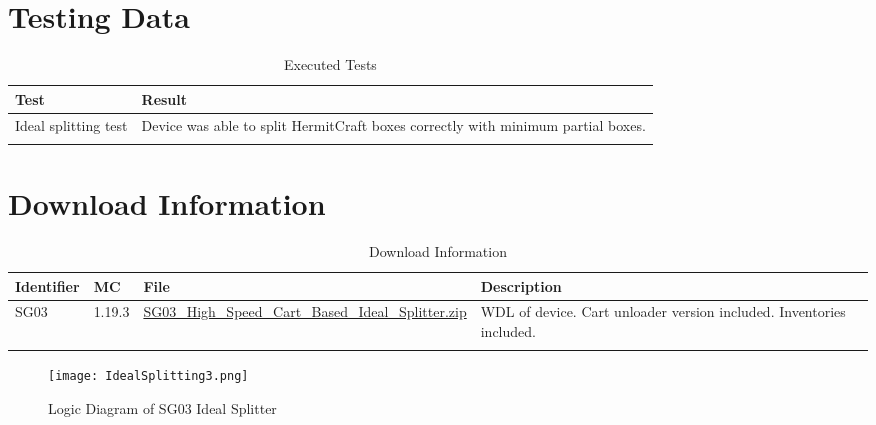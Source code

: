 \documentclass[10pt]{datasheet}
\begin{document}
\newpage
\section{Testing Data}
\begin{table}[h]
\caption{Executed Tests}
\begin{tabularx}{\textwidth}{l | X}
    \thickhline
    \textbf{Test} & \textbf{Result} \\
    \hline
    Ideal splitting test & Device was able to split HermitCraft boxes correctly with minimum partial boxes. \\
    \thickhline
\end{tabularx}
\end{table}

\section{Download Information}
\begin{table}[h]
    \caption{Download Information}
    \begin{tabularx}{\textwidth}{l | l | l | X}
        \thickhline
        \textbf{Identifier} & \textbf{MC} & \textbf{File} & \textbf{Description} \\
        \hline
        SG03 & 1.19.3 & \href{https://github.com/Soontech-Annals/Archive/blob/8413f90a054b6c415703bae02badeba7541344f6/Archive/splitting/SG03\%20High\%20Speed\%20Cart\%20Based\%20Ideal\%20Splitter/SG03\_High\_Speed\_Cart\_Based\_Ideal\_Splitter.zip?raw=1}{SG03\_High\_Speed\_Cart\_Based\_Ideal\_Splitter.zip} & WDL of device. Cart unloader version included. Inventories included. \\
        \hline
        \thickhline
    \end{tabularx}
\end{table}

\newpage
\begin{figure}
    \texttt{[image: IdealSplitting3.png]}
    \caption{\centering Logic Diagram of SG03 Ideal Splitter}
\end{figure}
\end{document}
